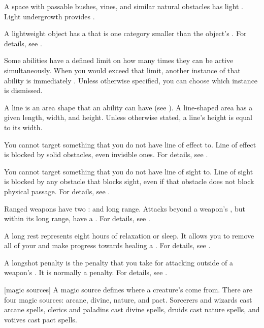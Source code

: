  A space with passable bushes, vines, and similar natural obstacles has light .
Light undergrowth provides .

 A lightweight object has a  that is one category smaller than the object's .
For details, see .

 Some abilities have a defined limit on how many times they can be active simultaneously.
When you would exceed that limit, another instance of that ability is immediately .
Unless otherwise specified, you can choose which instance is dismissed.

 A line is an area shape that an ability can have (see ).
A line-shaped area has a given length, width, and height.
Unless otherwise stated, a line's height is equal to its width.

 You cannot target something that you do not have line of effect to.
Line of effect is blocked by solid obstacles, even invisible ones.
For details, see .

 You cannot target something that you do not have line of sight to.
Line of sight is blocked by any obstacle that blocks sight, even if that obstacle does not block physical passage.
For details, see .

 Ranged weapons have two :  and long range.
Attacks beyond a weapon's , but within its long range, have a  .
For details, see .

 A long rest represents eight hours of relaxation or sleep.
It allows you to remove all of your  and make progress towards healing a .
For details, see .

 A longshot penalty is the penalty that you take for attacking outside of a weapon's .
It is normally a   penalty.
For details, see .

[magic sources] A magic source defines where a creature's  come from.
There are four magic sources: arcane, divine, nature, and pact.
Sorcerers and wizards cast arcane spells, clerics and paladins cast divine spells, druids cast nature spells, and votives cast pact spells.

